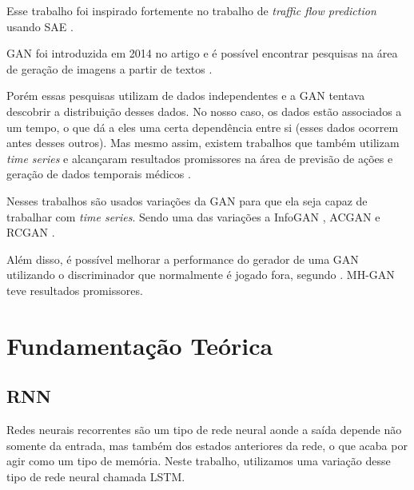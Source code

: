 
Esse trabalho foi inspirado fortemente no trabalho de \textit{traffic flow prediction} usando \acrshort{SAE} \cite{lv_6894591}.



\acrshort{GAN} foi introduzida em 2014 no artigo \cite{NIPS2014_5423} e é possível encontrar pesquisas na área de geração de imagens a partir de textos \cite{reed2016generative}.

Porém essas pesquisas utilizam de dados independentes e a \acrshort{GAN} tentava descobrir a distribuição desses dados. No nosso caso, os dados estão associados a um tempo, o que dá a eles uma certa dependência entre si (esses dados ocorrem antes desses outros). Mas mesmo assim, existem trabalhos que também utilizam \textit{time series} e alcançaram resultados promissores na área de previsão de ações \cite{zhou_2018} \cite{banushev_2019} e geração de dados temporais médicos \cite{esteban2017real}.

Nesses trabalhos são usados variações da \acrshort{GAN} para que ela seja capaz de trabalhar com \textit{time series}. Sendo uma das variações a \acrfull{InfoGAN} \cite{chen2016infogan}, \acrfull{ACGAN} \cite{odena2017conditional} e \acrfull{RCGAN} \cite{esteban2017real}.

Além disso, é possível melhorar a performance do gerador de uma \acrshort{GAN} utilizando o discriminador que normalmente é jogado fora, segundo \cite{turner2018metropolis}. \acrfull{MH-GAN} teve resultados promissores.

\section{Fundamentação Teórica}

\subsection{RNN}

Redes neurais recorrentes são um tipo de rede neural aonde a saída depende não somente da entrada, mas também dos estados anteriores da rede, o que acaba por agir como um tipo de memória. Neste trabalho, utilizamos uma variação desse tipo de rede neural chamada \acrfull{LSTM}.



